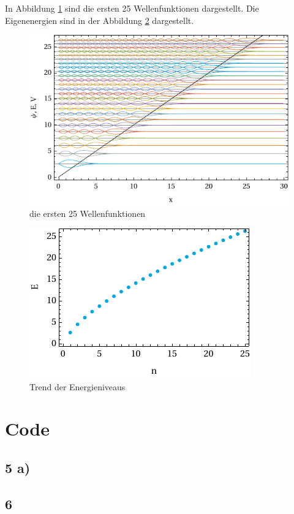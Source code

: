 In Abbildung \ref{fig:large} sind die ersten 25 Wellenfunktionen dargestellt. Die Eigenenergien sind in der Abbildung \ref{fig:trend} dargestellt.

\clearpage
\begin{figure}
	\centering
	\includegraphics[scale = 1.388888888]{img/large.pdf}
	\caption{die ersten 25 Wellenfunktionen}
	\label{fig:large}
\end{figure}

\begin{figure}
	\centering
	\includegraphics[scale = 1.388888888]{img/trend.pdf}
	\caption{Trend der Energieniveaus}
	\label{fig:trend}
\end{figure}


\clearpage
\section{Code}

\subsection*{5 a)}

\clearpage

\subsection*{6}


\clearpage



